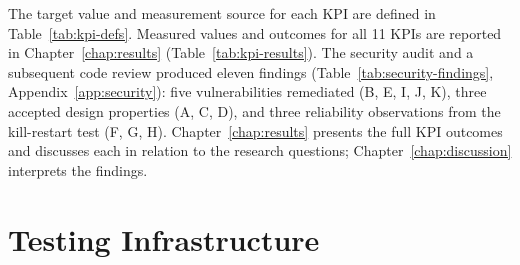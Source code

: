 The target value and measurement source for each KPI are defined in Table~\ref{tab:kpi-defs}. Measured values and outcomes for all 11 KPIs are reported in Chapter~\ref{chap:results} (Table~\ref{tab:kpi-results}). The security audit and a subsequent code review produced eleven findings (Table~\ref{tab:security-findings}, Appendix~\ref{app:security}): five vulnerabilities remediated (B, E, I, J, K), three accepted design properties (A, C, D), and three reliability observations from the kill-restart test (F, G, H). Chapter~\ref{chap:results} presents the full KPI outcomes and discusses each in relation to the research questions; Chapter~\ref{chap:discussion} interprets the findings.

\section{Testing Infrastructure}\label{sec:test-infra-ch6}

